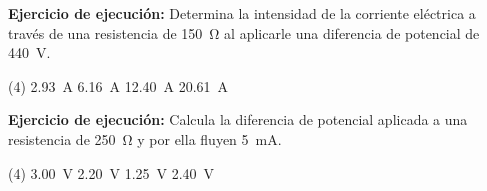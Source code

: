 \documentclass[12pt]{exam}
\begin{document}
\begin{questions}


    \question \label{Ejercicio_10} \textbf{Ejercicio de ejecución:} Determina la intensidad de la corriente eléctrica a través de una resistencia de \SI{150}{\ohm} al aplicarle una diferencia de potencial de \SI{440}{\volt}.
    \begin{tasks}(4)
        \task \SI{2.93}{\ampere}
        \task \SI{6.16}{\ampere}
        \task \SI{12.40}{\ampere}
        \task \SI{20.61}{\ampere}
    \end{tasks}
    \question \label{Ejercicio_11} \textbf{Ejercicio de ejecución: } Calcula la diferencia de potencial aplicada a una resistencia de \SI{250}{\ohm} y por ella fluyen \SI{5}{\milli\ampere}.
    \begin{tasks}(4)
        \task \SI{3.00}{\volt}
        \task \SI{2.20}{\volt}
        \task \SI{1.25}{\volt}
        \task \SI{2.40}{\volt}
    \end{tasks}

    \newpage


\end{questions}
\end{document}
